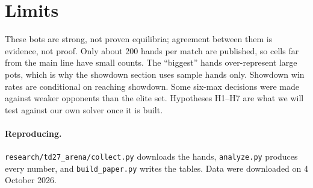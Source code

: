 \documentclass[10pt]{article}
\begin{document}
\section{Limits}

These bots are strong, not proven equilibria; agreement between them is evidence, not proof. Only
about 200 hands per match are published, so cells far from the main line have small counts. The
``biggest'' hands over-represent large pots, which is why the showdown section uses sample hands
only. Showdown win rates are conditional on reaching showdown. Some six-max decisions were made
against weaker opponents than the elite set. Hypotheses H1--H7 are what we will test against our own
solver once it is built.

\paragraph{Reproducing.} \texttt{research/td27\_arena/collect.py} downloads the hands,
\texttt{analyze.py} produces every number, and \texttt{build\_paper.py} writes the tables. Data were
downloaded on 4 October 2026.
\end{document}
